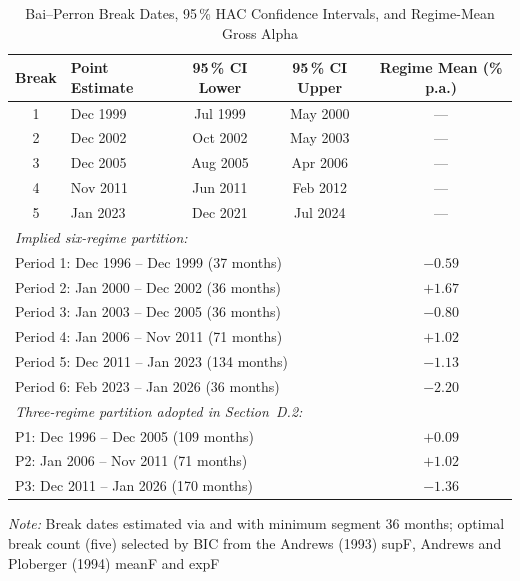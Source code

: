 \documentclass[12pt]{article}
\begin{document}
\begin{table}[H]
\centering
\caption{Bai--Perron Break Dates, 95\,\% HAC Confidence Intervals, and
         Regime-Mean Gross Alpha}
\label{tab:breaktest}
\small
\begin{tabular}{clccc}
\toprule
Break & Point Estimate & 95\,\% CI Lower & 95\,\% CI Upper
      & Regime Mean (\% p.a.) \\
\midrule
1 & Dec 1999 & Jul 1999 & May 2000 & --- \\
2 & Dec 2002 & Oct 2002 & May 2003 & --- \\
3 & Dec 2005 & Aug 2005 & Apr 2006 & --- \\
4 & Nov 2011 & Jun 2011 & Feb 2012 & --- \\
5 & Jan 2023 & Dec 2021 & Jul 2024 & --- \\
\midrule
\multicolumn{5}{l}{\textit{Implied six-regime partition:}} \\[3pt]
\multicolumn{4}{l}{Period 1: Dec 1996 -- Dec 1999 \hfill (37 months)}
    & $-0.59$ \\
\multicolumn{4}{l}{Period 2: Jan 2000 -- Dec 2002 \hfill (36 months)}
    & $+1.67$ \\
\multicolumn{4}{l}{Period 3: Jan 2003 -- Dec 2005 \hfill (36 months)}
    & $-0.80$ \\
\multicolumn{4}{l}{Period 4: Jan 2006 -- Nov 2011 \hfill (71 months)}
    & $+1.02$ \\
\multicolumn{4}{l}{Period 5: Dec 2011 -- Jan 2023 \hfill (134 months)}
    & $-1.13$ \\
\multicolumn{4}{l}{Period 6: Feb 2023 -- Jan 2026 \hfill (36 months)}
    & $-2.20$ \\
\midrule
\multicolumn{5}{l}{\textit{Three-regime partition adopted in Section~D.2:}} \\[3pt]
\multicolumn{4}{l}{P1: Dec 1996 -- Dec 2005 \hfill (109 months)}
    & $+0.09$ \\
\multicolumn{4}{l}{P2: Jan 2006 -- Nov 2011 \hfill (71 months)}
    & $+1.02$ \\
\multicolumn{4}{l}{P3: Dec 2011 -- Jan 2026 \hfill (170 months)}
    & $-1.36$ \\
\bottomrule
\end{tabular}
\begin{minipage}{\linewidth}
\vspace{4pt}
\footnotesize
\textit{Note:} Break dates estimated via \textcite{Bai1998} and \textcite{Bai2003}
with minimum segment 36 months; optimal break count (five) selected by BIC
from the Andrews (1993) supF, Andrews and Ploberger (1994) meanF and expF

\end{minipage}
\end{table}
\end{document}
